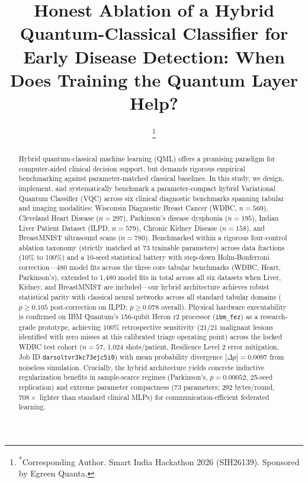 \documentclass[conference]{IEEEtran}
\begin{document}
\title{Honest Ablation of a Hybrid Quantum-Classical Classifier for Early Disease Detection: When Does Training the Quantum Layer Help?}

\author{
\thanks{\textsuperscript{*}Corresponding Author. Smart India Hackathon 2026 (SIH26139). Sponsored by Egreen Quanta.}
}

\maketitle

\begin{abstract}
Hybrid quantum-classical machine learning (QML) offers a promising paradigm for computer-aided clinical decision support, but demands rigorous empirical benchmarking against parameter-matched classical baselines. In this study, we design, implement, and systematically benchmark a parameter-compact hybrid Variational Quantum Classifier (VQC) across six clinical diagnostic benchmarks spanning tabular and imaging modalities: Wisconsin Diagnostic Breast Cancer (WDBC, $n=569$), Cleveland Heart Disease ($n=297$), Parkinson's disease dysphonia ($n=195$), Indian Liver Patient Dataset (ILPD, $n=579$), Chronic Kidney Disease ($n=158$), and BreastMNIST ultrasound scans ($n=780$). Benchmarked within a rigorous four-control ablation taxonomy (strictly matched at 73 trainable parameters) across data fractions (10\% to 100\%) and a 10-seed statistical battery with step-down Holm-Bonferroni correction---480 model fits across the three core tabular benchmarks (WDBC, Heart, Parkinson's), extended to 1,480 model fits in total across all six datasets when Liver, Kidney, and BreastMNIST are included---our hybrid architecture achieves robust statistical parity with classical neural networks across all standard tabular domains ($p \ge 0.105$ post-correction on ILPD; $p \ge 0.078$ overall). Physical hardware executability is confirmed on IBM Quantum's 156-qubit Heron r2 processor (\texttt{ibm\_fez}) as a research-grade prototype, achieving 100\% retrospective sensitivity (21/21 malignant lesions identified with zero misses at this calibrated triage operating point) across the locked WDBC test cohort ($n=57$, 1,024 shots/patient, Resilience Level 2 error mitigation, Job ID \texttt{darsoltvr3kc73ejc5i0}) with mean probability divergence $|\Delta p| = 0.0097$ from noiseless simulation. Crucially, the hybrid architecture yields concrete inductive regularization benefits in sample-scarce regimes (Parkinson's, $p=0.00052$, 25-seed replication) and extreme parameter compactness (73 parameters; 292 bytes/round, $708\times$ lighter than standard clinical MLPs) for communication-efficient federated learning.
\end{abstract}
\end{document}
